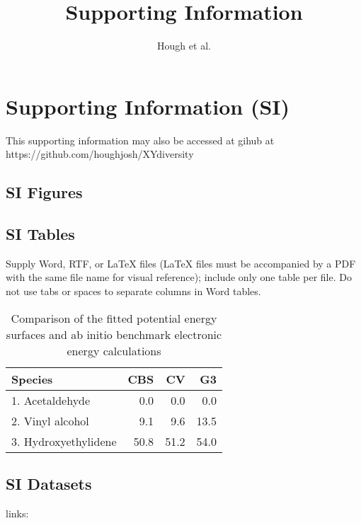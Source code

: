 \documentclass[9pt,twocolumn,twoside]{pnas-new}
\title{Supporting Information}
\author{Hough et al.}
\begin{document}
\maketitle

\section*{Supporting Information (SI)}

This supporting information may also be accessed at gihub at https://github.com/houghjosh/XYdiversity

\subsection*{SI Figures}


\subsection*{SI Tables}
Supply Word, RTF, or LaTeX files (LaTeX files must be accompanied by a PDF with the same file name for visual reference); include only one table per file. Do not use tabs or spaces to separate columns in Word tables.

\begin{table}[tbhp!]
\centering
\caption{Comparison of the fitted potential energy surfaces and ab initio benchmark electronic energy calculations}
\begin{tabular}{lrrr}
Species & CBS & CV & G3 \\
\midrule
1. Acetaldehyde & 0.0 & 0.0 & 0.0 \\
2. Vinyl alcohol & 9.1 & 9.6 & 13.5 \\
3. Hydroxyethylidene & 50.8 & 51.2 & 54.0\\
\bottomrule
\end{tabular}

\end{table}

\subsection*{SI Datasets}
links:
\end{document}
